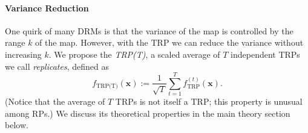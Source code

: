 \paragraph{Variance Reduction}
One quirk of many DRMs is that the variance of the map is controlled by the range $k$ of the map.
However, with the TRP we can reduce the variance without increasing $k$.
We propose the \emph{TRP(T)},
a scaled average of $T$ independent TRPs we call \emph{replicates},
defined as
\begin{equation}
f_{\text{TRP(T)}}(\mathbf{x}):= \frac{1}{\sqrt{T}}\sum_{t = 1}^T f^{(t)}_{\text{TRP} }(\mathbf{x}).
\end{equation}
(Notice that the average of $T$ TRPs is not itself a TRP; this property is unusual among RPs.)
We discuss its theoretical properties in the main theory section below.
